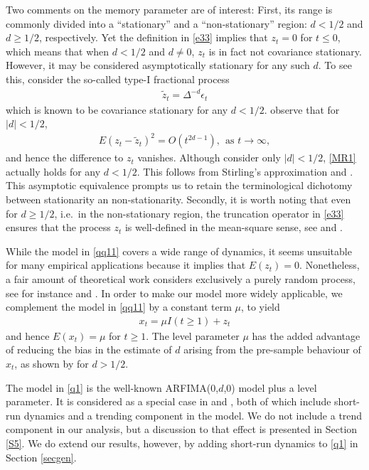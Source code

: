 {{Two comments on the memory parameter are of interest: First, its range is commonly divided into a ``stationary'' and a ``non-stationary'' region: $d < 1/2$ and $d \geq 1/2$, respectively. Yet the definition in \eqref{e33} implies
that $z_t = 0$ for $t \leq 0$, which means that when $d < 1/2$ and $d \neq 0$, $z_t$ is in fact not covariance stationary. However, it may be considered asymptotically stationary for any such $d$. To see this, consider the
so-called type-I fractional process
\begin{align}
    \tilde{z}_t = \Delta^{-d} \epsilon_t \label{type1zt}
\end{align}
which is known to be covariance stationary for any $d < 1/2$. \textcite{marinucci1999alternative} observe that for $|d| < 1/2$,
\begin{align} 
    E\left(  z_t - \tilde{z}_t \right)^2 = O(t^{2d -1}),\ \ \text{as } t \rightarrow \infty, \label{MR1}
\end{align}
and hence the difference to $z_t$ vanishes. Although \textcite{marinucci1999alternative} consider only $|d| < 1/2$, \eqref{MR1} actually holds for any $d < 1/2$. This follows from Stirling's approximation and \textcite[Lemma
A.1]{johansen2016role}. This asymptotic equivalence prompts us to retain the terminological dichotomy between stationarity an non-stationarity.  Secondly, it is worth noting that even for $d \geq 1/2$, i.e.\ in the non-stationary
region, the truncation operator in \eqref{e33} ensures that the process $z_{t}$ is well-defined in the mean-square sense, see \textcite[Section A.4]{johansen2008representation} and \textcite{hualde2011gaussian}.
    
While the model in \eqref{qq11} covers a wide range of dynamics, it seems unsuitable for many empirical applications because it implies that $E(z_t) = 0$. Nonetheless, a fair amount of theoretical work considers exclusively a
purely random process, see for instance \textcite{hualde2011gaussian} and \textcite{nielsen2015asymptotics}. In order to make our model more widely applicable, we complement the model in \eqref{qq11} by a constant term $\mu$, to yield
\begin{align}
    x_t = \mu I(t\geq 1) + z_t \label{q1}
\end{align}
and hence $E(x_t) = \mu$ for $t \geq 1$. The level parameter $\mu$ has the added advantage of reducing the bias in the estimate of $d$ arising from the pre-sample behaviour of $x_t$, as shown by \textcite{johansen2016role} for $d > 1/2$. 

The model in \eqref{q1} is the well-known ARFIMA(0,$d$,0) model plus a level parameter. It is considered as a special case in \textcite{hualde2020truncated} and \textcite{hualde2021truncated}, both of which include short-run dynamics and a trending component in the model. We do not include a trend
component in our analysis, but a discussion to that effect is presented in Section \ref{S5}. We do extend our results, however, by adding short-run dynamics to \eqref{q1} in Section \ref{secgen}.


}}
